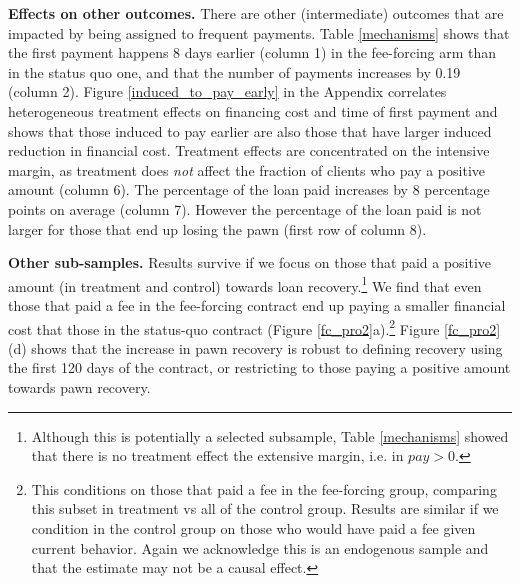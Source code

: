 \documentclass[oneside,11pt]{article}
\begin{document}
\vspace{.2in}
\noindent \textbf{Effects on other outcomes.} There are other (intermediate) outcomes that are impacted by being assigned to frequent payments. Table \ref{mechanisms} shows that the first payment happens 8 days earlier (column 1) in the fee-forcing arm than in the status quo one, and that the number of payments increases by 0.19 (column 2). Figure \ref{induced_to_pay_early} in the Appendix correlates heterogeneous treatment effects on financing cost and time of first payment and shows that those induced to pay earlier are also those that have larger induced reduction in financial cost. Treatment effects are concentrated on the intensive margin, as treatment does \textit{not} affect the fraction of clients who pay a positive amount (column 6). The percentage of the loan paid increases by 8 percentage points on average (column 7). However the percentage of the loan paid is not larger for those that end up losing the pawn (first row of column 8).

\vspace{.2in}
\noindent \textbf{Other sub-samples.}  Results survive if we focus on those that paid a positive amount (in treatment and control) towards loan recovery.\footnote{Although this is potentially a selected subsample, Table \ref{mechanisms} showed that there is no treatment effect the extensive margin, i.e. in $pay>0$.} We find that even those that paid a fee in the fee-forcing contract end up paying a smaller financial cost that those in the status-quo contract (Figure \ref{fc_pro2}a).\footnote{This conditions on those that paid a fee in the fee-forcing group, comparing this subset in treatment vs all of the control group. Results are similar if we condition in the control group on those who would have paid a fee given current behavior. Again we acknowledge this is an endogenous sample and that the estimate may not be a causal effect.}  Figure \ref{fc_pro2}(d) shows that the increase in pawn recovery is robust to defining recovery using the first 120 days of the contract, or restricting to those paying a positive amount towards pawn recovery.

\end{document}
